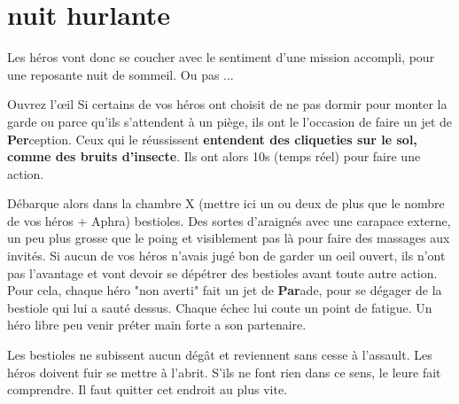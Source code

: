 \section{nuit hurlante}

Les héros vont donc se coucher avec le sentiment d’une mission accompli, pour une reposante nuit de sommeil. Ou pas ...

\begin{paperbox}{Ouvrez l’œil}
Si certains de vos héros ont choisit de ne pas dormir pour monter la garde ou parce qu’ils s’attendent à un piège, ils ont le l’occasion de faire un jet de \textbf{Per}ception. Ceux qui le réussissent \textbf{entendent des cliqueties sur le sol, comme des bruits d’insecte}. Ils ont alors 10s (temps réel) pour faire une action.
\end{paperbox}

Débarque alors dans la chambre X (mettre ici un ou deux de plus que le nombre de vos héros + Aphra) bestioles. Des sortes d’araignés avec une carapace externe, un peu plus grosse que le poing et visiblement pas là pour faire des massages aux invités. Si aucun de vos héros n’avais jugé bon de garder un oeil ouvert, ils n’ont pas l’avantage et vont devoir se dépétrer des bestioles avant toute autre action. Pour cela, chaque héro "non averti" fait un jet de \textbf{Par}ade, pour se dégager de la bestiole qui lui a sauté dessus. Chaque échec lui coute un point de fatigue. Un héro libre peu venir préter main forte a son partenaire.

Les bestioles ne subissent aucun dégât et reviennent sans cesse à l’assault. Les héros doivent fuir se mettre à l’abrit. S’ils ne font rien dans ce sens,  le leure fait comprendre. Il faut quitter cet endroit au plus vite.